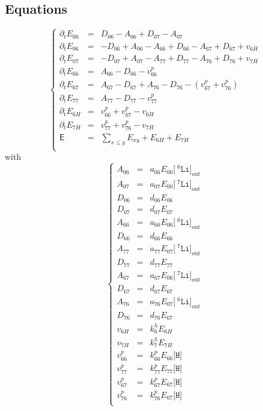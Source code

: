 \documentclass[aps,onecolumn,11pt]{revtex4}
\newcommand{\mychem}[1]{\mathtt{#1}}
\newcommand{\myconc}[1]{\big[#1\big]}
\newcommand{\spLi}[1]{{\!~^{#1}\mychem{Li}}}
\newcommand{\Li}[1]{\myconc{\spLi{#1}}}
\newcommand{\spproton}{\mychem{H}}
\newcommand{\proton}{\myconc{\spproton}}
\newcommand{\myout}[1]{{#1}_{\mathrm{out}}}
\newcommand{\LiOut}[1]{\myout{\Li{#1}}}
\begin{document}
\subsection{Equations}
\begin{equation}
\left\lbrace
\begin{array}{rcl}
\partial_t E_{00} & = & D_{06}-A_{06} + D_{07}-A_{07}\\
\partial_t E_{06} & = & -D_{06}+A_{06} - A_{66} + D_{66} - A_{67} + D_{67} + v_{6H}\\
\partial_t E_{07} & = & -D_{07}+A_{07} - A_{77} + D_{77} - A_{76} + D_{76} + v_{7H}\\
\partial_t E_{66} & = & A_{66}-D_{66} -v^p_{66}\\
\partial_t E_{67} & = & A_{67}-D_{67} + A_{76}-D_{76} - (v^p_{67}+v^p_{76})\\
\partial_t E_{77} & = & A_{77}-D_{77} - v^p_{77}\\
\partial_t E_{6H} & = & v^p_{66}+v^p_{67} - v_{6H}\\
\partial_t E_{7H} & = & v^p_{77}+v^p_{76} - v_{7H}\\
\mathsf{E}      & = & {\displaystyle \sum_{x\leq y} E_{xy}}+E_{6H}+E_{7H}\\
\end{array}
\right.
\end{equation}
with
\begin{equation}
\left\lbrace
\begin{array}{rcl}
A_{06}   & = & a_{06} E_{00} \LiOut{6}\\
A_{07}   & = & a_{07} E_{00} \LiOut{7}\\
D_{06}   & = & d_{06} E_{06}\\
D_{07}   & = & d_{07} E_{07}\\
A_{66}   & = & a_{66} E_{06} \LiOut{6} \\
D_{66}   & = & d_{66} E_{66}\\
A_{77}   & = & a_{77} E_{07} \LiOut{7} \\
D_{77}   & = & d_{77} E_{77}\\
A_{67}   & = & a_{67} E_{06} \LiOut{7}\\
D_{67}   & = & d_{67} E_{67}\\
A_{76}   & = & a_{76} E_{07} \LiOut{6}\\
D_{76}   & = & d_{76} E_{67}\\
v_{6H}   & = & k^h_6 E_{6H}\\
v_{7H}   & = & k^h_7 E_{7H}\\
v^p_{66} & = & k^p_{66} E_{66} \proton \\
v^p_{77} & = & k^p_{77} E_{77} \proton \\
v^p_{67} & = & k^p_{67} E_{67} \proton \\
v^p_{76} & = & k^p_{76} E_{67} \proton \\
\end{array}
\right.
\end{equation}
\end{document}
